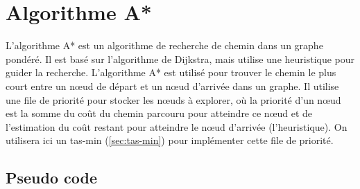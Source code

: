 \section{Algorithme A*}
\label{sec:a-star}

L'algorithme A* est un algorithme de recherche de chemin dans un graphe pondéré.
Il est basé sur l'algorithme de Dijkstra, mais utilise une heuristique pour guider la recherche.
L'algorithme A* est utilisé pour trouver le chemin le plus court entre un nœud de départ et un nœud d'arrivée dans un graphe.
\newline
Il utilise une file de priorité pour stocker les nœuds à explorer, où la priorité d'un nœud est la somme du coût du chemin parcouru pour atteindre ce nœud et de l'estimation du coût restant pour atteindre le nœud d'arrivée (l'heuristique). 
On utilisera ici un tas-min (\autoref{sec:tas-min}) pour implémenter cette file de priorité.

\subsection{Pseudo code}

